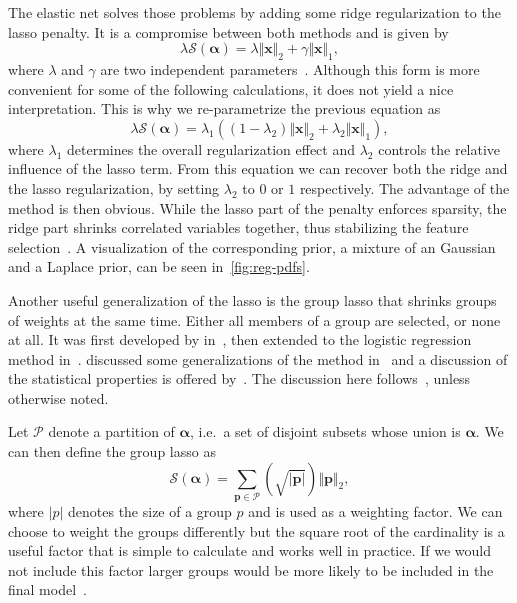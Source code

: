 The elastic net solves those problems by adding some ridge regularization to the
lasso penalty.
It is a compromise between both methods and is given by
\begin{equation}
  \label{eq:elastic-net}
  \lambda \mathcal{S}(\bm{\alpha}) = \lambda \Vert \bm{x} \Vert_2 +  \gamma \Vert \bm{x} \Vert _1,
\end{equation}
where \(\lambda\) and \(\gamma\) are two independent parameters~\cite{elasticnet}.
Although this form is more convenient for some of the following calculations, it does
not yield a nice interpretation.
This is why we re-parametrize the previous equation as
\begin{equation*}
  \lambda \mathcal{S}(\bm{\alpha}) = \lambda_1 \left( \left(1 - \lambda_2 \right) \Vert \bm{x} \Vert_2  + \lambda_2 \Vert \bm{x} \Vert _1\right),
\end{equation*}
where \(\lambda_1\) determines the overall regularization effect and \(\lambda_2\) controls the relative influence of the lasso term.
From this equation we can recover both the ridge and the lasso regularization, by setting \(\lambda_2\) to \(0\) or \(1\) respectively.
The advantage of the method is then obvious.
While the lasso part of the penalty enforces sparsity, the ridge part shrinks
correlated variables together, thus stabilizing the feature selection~\cite{elasticnet}.
A visualization of the corresponding prior, a mixture of an Gaussian and a Laplace prior, can be seen in~\cref{fig:reg-pdfs}.

Another useful generalization of the lasso is the group lasso that shrinks groups of weights at the same time.
Either all members of a group are selected, or none at all.
It was first developed by \citeauthor{grouplasso} in~\cite{grouplasso}, then
extended to the logistic regression method in~\cite{grouplasso-logistic}.
\citeauthor{grouplasso-generalizations} discussed some generalizations of the
method in~\cite{grouplasso-generalizations} and a discussion of the statistical
properties is offered by~\cite{grouplasso-benefit}.
The discussion here follows~\cite{sparse-learning}, unless otherwise noted.

Let \(\mathcal{P}\) denote a partition of \(\bm{\alpha}\), i.e.~a set of disjoint subsets whose union is \(\bm{\alpha}\).
We can then define the group lasso as
\begin{equation*}
  \mathcal{S}({\bm{\alpha}}) = \sum_{\bm{p} \in \mathcal{P}} \left(\sqrt{\vert \bm{p} \vert}\right) \Vert  \bm{p} \Vert_2,
\end{equation*}
where \(\vert p \vert\) denotes the size of a group \(p\) and is used as a weighting factor.
We can choose to weight the groups differently but the square root of the cardinality is a useful factor that is simple to calculate and works well in practice.
If we would not include this factor larger groups would be more likely to be included in the final model~\cite{sparse-learning}.


